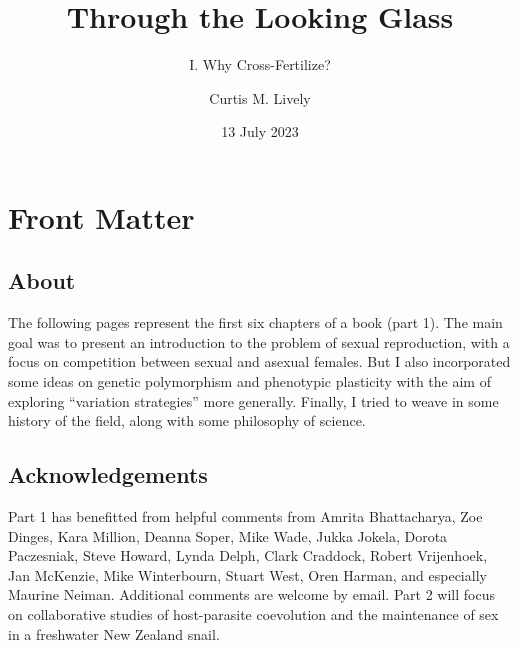 \documentclass[
  letterpaper,
]{book}
\title{Through the Looking Glass}
\subtitle{I. Why Cross-Fertilize?}
\author{Curtis M. Lively}
\date{13 July 2023}
\renewcommand*\contentsname{Table of contents}
\newcommand\contentsname{Table of contents}
\begin{document}
\frontmatter
\maketitle
\ifdefined\Shaded\renewenvironment{Shaded}{\begin{tcolorbox}[sharp corners, borderline west={3pt}{0pt}{shadecolor}, breakable, boxrule=0pt, interior hidden, frame hidden, enhanced]}{\end{tcolorbox}}\fi

\renewcommand*\contentsname{Contents}
{
\hypersetup{linkcolor=}
\setcounter{tocdepth}{2}
\tableofcontents
}
\listoffigures
\listoftables
\mainmatter
{}

\hypertarget{front-matter}{%
\chapter*{Front Matter}\label{front-matter}}


\hypertarget{about}{%
\section*{About}\label{about}}


The following pages represent the first six chapters of a book (part 1).
The main goal was to present an introduction to the problem of sexual
reproduction, with a focus on competition between sexual and asexual
females. But I also incorporated some ideas on genetic polymorphism and
phenotypic plasticity with the aim of exploring ``variation strategies''
more generally. Finally, I tried to weave in some history of the field,
along with some philosophy of science.

\hypertarget{acknowledgements}{%
\section*{Acknowledgements}\label{acknowledgements}}


Part 1 has benefitted from helpful comments from Amrita Bhattacharya,
Zoe Dinges, Kara Million, Deanna Soper, Mike Wade, Jukka Jokela, Dorota
Paczesniak, Steve Howard, Lynda Delph, Clark Craddock, Robert
Vrijenhoek, Jan McKenzie, Mike Winterbourn, Stuart West, Oren Harman,
and especially Maurine Neiman. Additional comments are welcome by email.
Part 2 will focus on collaborative studies of host-parasite coevolution
and the maintenance of sex in a freshwater New Zealand snail.
\end{document}
